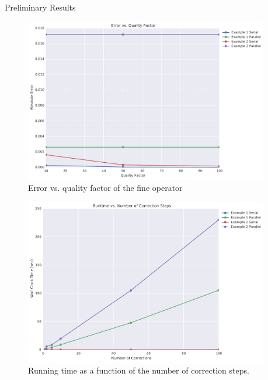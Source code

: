 \documentclass[final]{beamer}
\newlength{\sepwid}
\newlength{\onecolwid}
\begin{document}
\begin{frame}[t]
\begin{columns}[t]
\begin{column}{\onecolwid}
\begin{block}{Preliminary Results}
\begin{figure}
\includegraphics[width=0.75\linewidth]{../data/error_vs_qualityfactor.pdf}
\caption{Error vs. quality factor of the fine operator}
\label{fig:err_v_q}
\end{figure}

\begin{figure}
\includegraphics[width=0.75\linewidth]{../data/runtime_vs_corrections.pdf}
\caption{Running time as a function of the number of correction steps.}
\label{fig:run_v_k}
\end{figure}

\end{block}


\end{column} %



\begin{column}{\sepwid}\end{column} %


\end{columns}
\end{frame}
\end{document}
